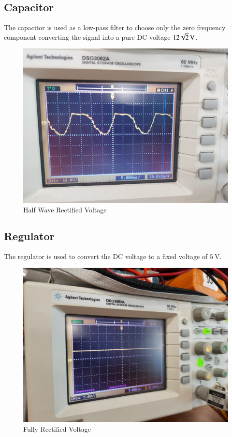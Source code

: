 \documentclass[journal,12pt,twocolumn]{IEEEtran}
\begin{document}
\subsection{Capacitor}
The capacitor is used as a low-pass filter to choose only the zero frequency component
converting the signal into a pure DC voltage \( \SI[parse-numbers=false]{12\sqrt{2}}{\volt} \).
\begin{figure}[!htb]
    \includegraphics[width=\columnwidth]{figs/half-rectified}
    \caption{Half Wave Rectified Voltage}
    \label{fig:half-rectified}
\end{figure}


\subsection{Regulator}
The regulator is used to convert the DC voltage to a fixed voltage of \( \SI{5}{\volt} \).
\begin{figure}[!htb]
    \includegraphics[width=\columnwidth]{figs/final}
    \caption{Fully Rectified Voltage}
    \label{fig:rectified}
\end{figure}
\end{document}

